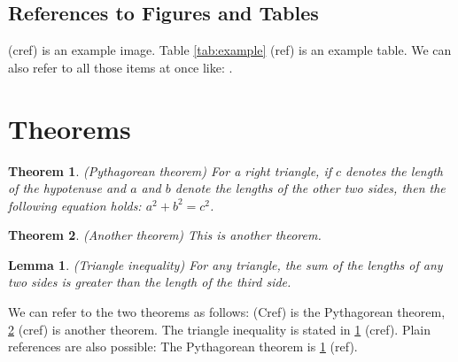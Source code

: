 \documentclass{article}
\newtheorem{thm}{Theorem}
\newtheorem{lem}{Lemma}
\begin{document}
\subsection{References to Figures and Tables}
 (cref) is an example image. Table \ref{tab:example} (ref) is an example table. We can also refer to all those items at once like: .

\section{Theorems}

\begin{thm}
    \label{thm:pythagorean}
    (Pythagorean theorem) For a right triangle, if $c$ denotes the length of the hypotenuse and $a$ and $b$ denote the lengths of the other two sides, then the following equation holds: $a^2 + b^2 = c^2$.
\end{thm}

\begin{thm}
    \label{thm:another}
    (Another theorem) This is another theorem.
\end{thm}


\begin{lem}
    \label{lem:triangle_inequality}
    (Triangle inequality) For any triangle, the sum of the lengths of any two sides is greater than the length of the third side.
\end{lem}

We can refer to the two theorems as follows:  (Cref) is the Pythagorean theorem, \cref{thm:another} (cref) is another theorem. The triangle inequality is stated in \cref{lem:triangle_inequality} (cref). Plain references are also possible: The Pythagorean theorem is \ref{thm:pythagorean} (ref).

\listoffigures

\listoftables
\end{document}
